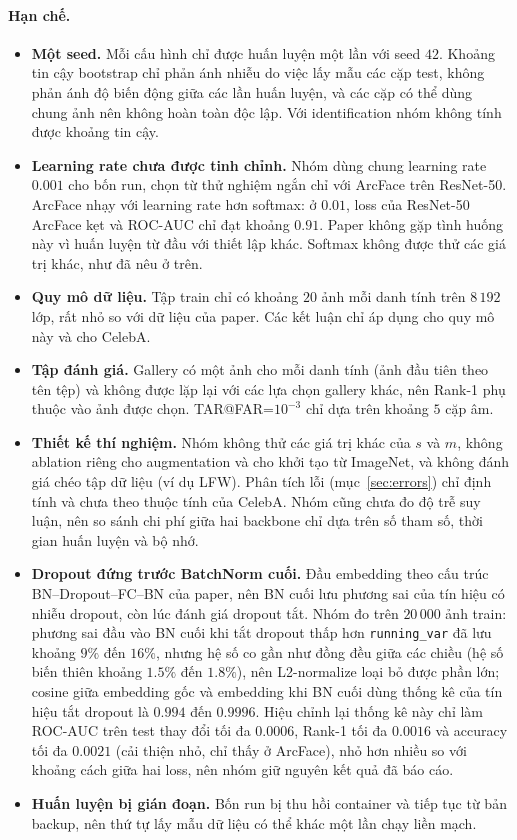 \documentclass[a4paper,12pt]{article}
\begin{document}
\paragraph{Hạn chế.}
\begin{itemize}
    \item \textbf{Một seed.} Mỗi cấu hình chỉ được huấn luyện một lần với seed $42$. Khoảng tin cậy bootstrap chỉ phản ánh nhiễu do việc lấy mẫu các cặp test, không phản ánh độ biến động giữa các lần huấn luyện, và các cặp có thể dùng chung ảnh nên không hoàn toàn độc lập. Với identification nhóm không tính được khoảng tin cậy.
    \item \textbf{Learning rate chưa được tinh chỉnh.} Nhóm dùng chung learning rate $0.001$ cho bốn run, chọn từ thử nghiệm ngắn chỉ với ArcFace trên ResNet-50. ArcFace nhạy với learning rate hơn softmax: ở $0.01$, loss của ResNet-50 ArcFace kẹt và ROC-AUC chỉ đạt khoảng $0.91$. Paper không gặp tình huống này vì huấn luyện từ đầu với thiết lập khác. Softmax không được thử các giá trị khác, như đã nêu ở trên.
    \item \textbf{Quy mô dữ liệu.} Tập train chỉ có khoảng $20$ ảnh mỗi danh tính trên $8\,192$ lớp, rất nhỏ so với dữ liệu của paper. Các kết luận chỉ áp dụng cho quy mô này và cho CelebA.
    \item \textbf{Tập đánh giá.} Gallery có một ảnh cho mỗi danh tính (ảnh đầu tiên theo tên tệp) và không được lặp lại với các lựa chọn gallery khác, nên Rank-1 phụ thuộc vào ảnh được chọn. TAR@FAR=$10^{-3}$ chỉ dựa trên khoảng $5$ cặp âm.
    \item \textbf{Thiết kế thí nghiệm.} Nhóm không thử các giá trị khác của $s$ và $m$, không ablation riêng cho augmentation và cho khởi tạo từ ImageNet, và không đánh giá chéo tập dữ liệu (ví dụ LFW). Phân tích lỗi (mục~\ref{sec:errors}) chỉ định tính và chưa theo thuộc tính của CelebA. Nhóm cũng chưa đo độ trễ suy luận, nên so sánh chi phí giữa hai backbone chỉ dựa trên số tham số, thời gian huấn luyện và bộ nhớ.
    \item \textbf{Dropout đứng trước BatchNorm cuối.} Đầu embedding theo cấu trúc BN--Dropout--FC--BN của paper, nên BN cuối lưu phương sai của tín hiệu có nhiễu dropout, còn lúc đánh giá dropout tắt. Nhóm đo trên $20\,000$ ảnh train: phương sai đầu vào BN cuối khi tắt dropout thấp hơn \texttt{running\_var} đã lưu khoảng $9\%$ đến $16\%$, nhưng hệ số co gần như đồng đều giữa các chiều (hệ số biến thiên khoảng $1.5\%$ đến $1.8\%$), nên L2-normalize loại bỏ được phần lớn; cosine giữa embedding gốc và embedding khi BN cuối dùng thống kê của tín hiệu tắt dropout là $0.994$ đến $0.9996$. Hiệu chỉnh lại thống kê này chỉ làm ROC-AUC trên test thay đổi tối đa $0.0006$, Rank-1 tối đa $0.0016$ và accuracy tối đa $0.0021$ (cải thiện nhỏ, chỉ thấy ở ArcFace), nhỏ hơn nhiều so với khoảng cách giữa hai loss, nên nhóm giữ nguyên kết quả đã báo cáo.
    \item \textbf{Huấn luyện bị gián đoạn.} Bốn run bị thu hồi container và tiếp tục từ bản backup, nên thứ tự lấy mẫu dữ liệu có thể khác một lần chạy liền mạch.
\end{itemize}
\end{document}
